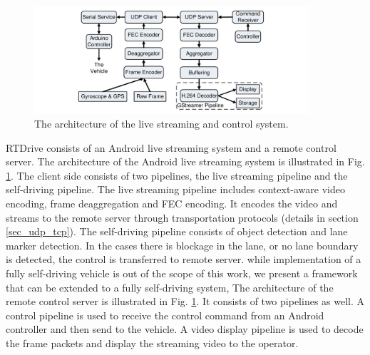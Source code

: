 


\begin{figure}[t]
\centering
  \includegraphics[width=4.0in,angle=0]{Figs/RTDrive/architecture.pdf}
\caption{The architecture of the live streaming and control system.}
\vspace{-0.5cm}
\label{server}
\end{figure}

RTDrive consists of an Android live streaming system and 
a remote control server. 
The architecture of the Android live streaming system is illustrated
in Fig. \ref{server}. 
The client side consists of two pipelines, the live streaming pipeline and the self-driving
pipeline. 
The live streaming pipeline includes context-aware video encoding, frame
deaggregation and FEC encoding.  
It encodes the video and streams to the remote server through transportation
protocols (details in section \ref{sec_udp_tcp}). 
The self-driving pipeline consists of object detection and lane marker detection. 
In the cases there is blockage in the lane, or no lane boundary is detected,
the control is transferred to remote server. 
while implementation of a fully self-driving vehicle
is out of the scope of this work, 
we present a framework that can be extended to a fully self-driving system, 
The architecture of the remote control server is illustrated in Fig. \ref{server}. 
It consists of two pipelines as well. 
A control pipeline is used to receive the control command from
an Android controller and then send to the vehicle. 
A video display pipeline is used to decode the frame packets
and display the streaming video to the operator. 



